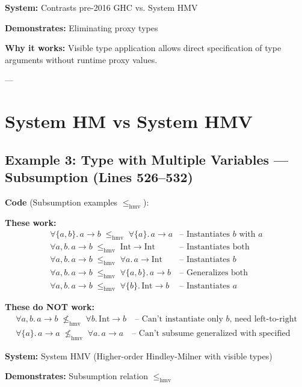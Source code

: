 \documentclass[11pt,a4paper]{article}
\begin{document}
\textbf{System:} Contrasts pre-2016 GHC vs. System HMV

\textbf{Demonstrates:} Eliminating proxy types

\textbf{Why it works:} Visible type application allows direct specification of type arguments without runtime proxy values.

---

\section{System HM vs System HMV}

\subsection{Example 3: Type with Multiple Variables --- Subsumption (Lines 526--532)}

\textbf{Code} (Subsumption examples $\leq_{\text{hmv}}$):

\textbf{These work:}
\[
\begin{array}{ll}
\forall \{a, b\}.\, a \to b \;\leq_{\text{hmv}}\; \forall \{a\}.\, a \to a & \text{-- Instantiates } b \text{ with } a \\[4pt]
\forall a, b.\, a \to b \;\leq_{\text{hmv}}\; \text{Int} \to \text{Int} & \text{-- Instantiates both} \\[4pt]
\forall a, b.\, a \to b \;\leq_{\text{hmv}}\; \forall a.\, a \to \text{Int} & \text{-- Instantiates } b \\[4pt]
\forall a, b.\, a \to b \;\leq_{\text{hmv}}\; \forall \{a, b\}.\, a \to b & \text{-- Generalizes both} \\[4pt]
\forall a, b.\, a \to b \;\leq_{\text{hmv}}\; \forall \{b\}.\, \text{Int} \to b & \text{-- Instantiates } a
\end{array}
\]

\textbf{These do NOT work:}
\[
\begin{array}{l}
\forall a, b.\, a \to b \;\not\leq_{\text{hmv}}\; \forall b.\, \text{Int} \to b \quad \text{-- Can't instantiate only } b \text{, need left-to-right} \\[4pt]
\forall \{a\}.\, a \to a \;\not\leq_{\text{hmv}}\; \forall a.\, a \to a \quad \text{-- Can't subsume generalized with specified}
\end{array}
\]

\textbf{System:} System HMV (Higher-order Hindley-Milner with visible types)

\textbf{Demonstrates:} Subsumption relation $\leq_{\text{hmv}}$
\end{document}
